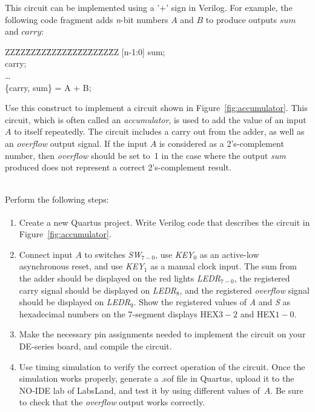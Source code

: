 \documentclass[epsfig,10pt,fullpage]{article}
\begin{document}
This circuit can be implemented using a '+' sign in Verilog. For example, the following code 
fragment adds {\it n}-bit numbers $A$ and $B$ to produce outputs $sum$ and $carry$:

\begin{center}
\begin{minipage}[t]{12.5 cm}
\begin{tabbing}
ZZ\=ZZ\=ZZ\=ZZ\=ZZ\=ZZ\=ZZ\=ZZ\=ZZ\=ZZ\=ZZ\kill
{} [n-1:0] sum;\\
 carry;\\
\>\ldots \\
 \{carry, sum\} = A + B;\\
\end{tabbing}
\end{minipage}
\end{center}

Use this construct to implement a circuit shown in Figure~\ref{fig:accumulator}. This
circuit, which is often called an {\it accumulator}, is used to add the value of an input
$A$ to itself repeatedly. The circuit includes a carry out from the adder, as well as an
{\it overflow} output signal. If the input $A$ is considered as a 2's-complement number, 
then {\it overflow} should be set to~1
in the case where the output {\it sum} produced does not represent a correct
2's-complement result.

~\\
Perform the following steps:
\begin{enumerate}
\item Create a new Quartus\textsuperscript{\textregistered} project. Write Verilog code that describes the 
circuit in Figure~\ref{fig:accumulator}.
\item Connect input $A$ to switches {\it SW}$_{7-0}$, use {\it KEY}$_0$ as an 
active-low asynchronous reset, and use {\it KEY}$_1$ as a manual clock input. The sum 
from the adder should be displayed on the red lights {\it LEDR}$_{7-0}$, the registered 
carry signal should be displayed on {\it LEDR}$_{8}$, and the registered {\it overflow} 
signal should be displayed on {\it LEDR}$_{9}$. Show the registered values of {\it A}
and {\it S} as hexadecimal numbers on the 7-segment displays HEX$3-2$ and HEX$1-0$. 
\item Make the necessary pin assignments needed to implement the circuit on your
DE-series board, and compile the circuit.
\item Use timing simulation to verify the correct operation of the
circuit. Once the simulation works properly, generate a .sof file in Quartus, upload it to the NO-IDE lab of LabsLand,
and test it by using different values of~$A$. Be sure to check that the {\it overflow} 
output works correctly.
\end{enumerate}
\end{document}
